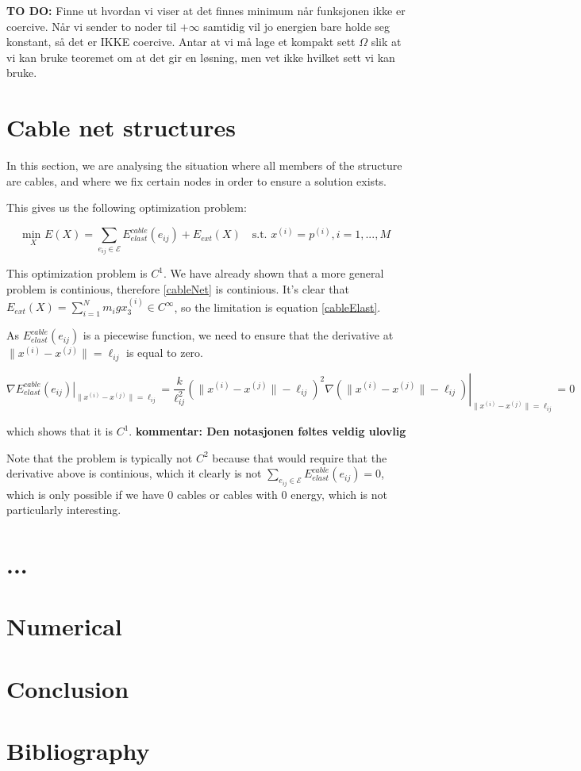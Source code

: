 \documentclass[11pt]{article}
\newcommand{\el}{\ell_{ij}}
\newcommand{\xnorm}{\lVert x^{(i)} - x^{(j)}\rVert}
\newcommand{\sumset}[1]{\sum\limits_{e_{ij} \in \mathcal{#1}}}
\newcommand{\ece}{E^{cable}_{elast}(e_{ij})}
\newcommand{\ee}{E_{ext}(X)}
\newcommand\at[2]{\left.#1\right|_{#2}}
\begin{document}
\textbf{TO DO:}
Finne ut hvordan vi viser at det finnes minimum når funksjonen ikke er coercive. Når vi sender to noder til $+\infty$ samtidig vil jo energien bare holde seg konstant, så det er IKKE coercive. Antar at vi må lage et kompakt sett $\Omega$ slik at vi kan bruke teoremet om at det gir en løsning, men vet ikke hvilket sett vi kan bruke.
\section{Cable net structures}
In this section, we are analysing the situation where all members of the structure are cables, and where we fix certain nodes in order to ensure a solution exists.

This gives us the following optimization problem:

\begin{equation}
    \underset{X}{\text{min }} E(X) = \sumset{E} \ece + \ee \quad \text{s.t. } x^{(i)} = p^{(i)}, i = 1,...,M
    \label{cableNet}
\end{equation}

This optimization problem is $C^1$. We have already shown that a more general problem is continious, therefore \eqref{cableNet} is continious. It's clear that $\ee = \sum_{i=1}^N m_i g x_3^{(i)} \in C^{\infty}$, so the limitation is equation \eqref{cableElast}.

As $\ece$ is a piecewise function, we need to ensure that the derivative at $\xnorm = \el$ is equal to zero.

\begin{equation}
    \at{\nabla \ece}{\xnorm = \el} = \at{ \frac{k}{\el^2}(\xnorm - \el)^2 \nabla (\xnorm-\el) }{\xnorm = \el} = 0
\end{equation}

which shows that it is $C^1$.
\textbf{kommentar: Den notasjonen føltes veldig ulovlig}

Note that the problem is typically not $C^2$ because that would require that the derivative above is continious, which it clearly is not
$\sumset{E} \ece = 0$, which is only possible if we have $0$ cables or cables with $0$ energy, which is not particularly interesting.

\section{...}
\section{Numerical}
\section{Conclusion}
\section{Bibliography}
\end{document}
